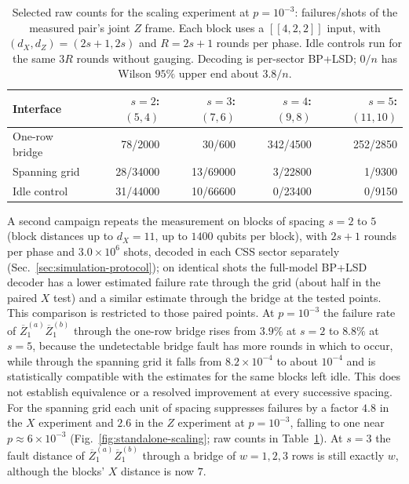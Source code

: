 \begin{table}[t]
\caption{Selected raw counts for the scaling experiment at $p=10^{-3}$:
failures/shots of the measured pair's joint $Z$ frame. Each block uses a
$[[4,2,2]]$ input, with $(d_X,d_Z)=(2s+1,2s)$ and $R=2s+1$ rounds per
phase. Idle controls run for the same $3R$ rounds without gauging.
Decoding is per-sector BP+LSD; $0/n$ has Wilson $95\%$ upper end about $3.8/n$.}
\label{tab:standalone-counts}
\centering\small
\begin{tabular}{@{}lrrrr@{}}
\toprule
Interface & $s=2$: $(5,4)$ & $s=3$: $(7,6)$ & $s=4$: $(9,8)$ & $s=5$: $(11,10)$\\
\midrule
One-row bridge & 78/2000 & 30/600 & 342/4500 & 252/2850\\
Spanning grid & 28/34000 & 13/69000 & 3/22800 & 1/9300\\
Idle control & 31/44000 & 10/66600 & 0/23400 & 0/9150\\
\bottomrule
\end{tabular}
\end{table}

A second campaign repeats the measurement on blocks of spacing $s=2$ to $5$
(block distances up to $d_X=11$, up to $1400$ qubits per block), with $2s+1$
rounds per phase and $3.0\times10^6$ shots, decoded in each CSS sector
separately (Sec.~\ref{sec:simulation-protocol}); on identical
shots the full-model BP+LSD decoder has a lower estimated failure rate
through the grid (about half in the paired $X$ test) and a similar estimate
through the bridge at the tested points. This comparison is restricted to
those paired points.  At $p=10^{-3}$ the failure rate of
$\overline Z_1^{(a)}\overline Z_1^{(b)}$ through the one-row bridge rises from
$3.9\%$ at $s=2$ to $8.8\%$ at $s=5$, because the undetectable bridge fault
has more rounds in which to occur, while through the spanning grid it falls
from $8.2\times10^{-4}$ to about $10^{-4}$ and is statistically compatible with the estimates for the same blocks
left idle. This does not establish equivalence or a resolved improvement
at every successive spacing.  For the spanning grid each unit of spacing suppresses failures by
a factor $4.8$ in the $X$ experiment and $2.6$ in the $Z$ experiment at
$p=10^{-3}$, falling to one near $p\approx6\times10^{-3}$
(Fig.~\ref{fig:standalone-scaling}; raw counts in Table~\ref{tab:standalone-counts}).  At $s=3$ the fault distance of
$\overline Z_1^{(a)}\overline Z_1^{(b)}$ through a bridge of $w=1,2,3$ rows is
still exactly $w$, although the blocks' $X$ distance is now $7$.

